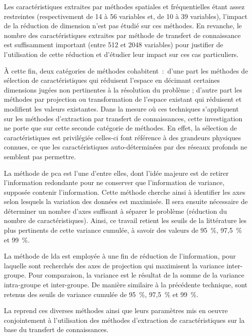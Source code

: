 Les caractéristiques extraites par méthodes spatiales et fréquentielles étant assez restreintes (respectivement de 14 à 56 variables et, de 10 à 39 variables), l'impact de la réduction de dimension n'est pas étudié sur ces méthodes. En revanche, le nombre des caractéristiques extraites par méthode de transfert de connaissance est suffisamment important (entre 512 et 2048 variables) pour justifier de l'utilisation de cette réduction et d'étudier leur impact sur ces cas particuliers.\par

À cette fin, deux catégories de méthodes cohabitent~:~d'une part les méthodes de sélection de caractéristiques qui réduisent l'espace en décimant certaines dimensions jugées non pertinentes à la résolution du problème ; d'autre part les méthodes par projection ou transformation de l'espace existant qui réduisent et modifient les valeurs existantes. Dans la mesure où ces techniques s'appliquent sur les méthodes d'extraction par transfert de connaissances, cette investigation ne porte que sur cette seconde catégorie de méthodes. En effet, la sélection de caractéristiques est privilégiée celles-ci font référence à des grandeurs physiques connues, ce que les caractéristiques auto-déterminées par des réseaux profonds ne semblent pas permettre.\par

La méthode de \gls{pca} est l'une d'entre elles, dont l'idée majeure est de retirer l'information redondante pour ne conserver que l'information de variance, supposée contenir l'information. Cette méthode cherche ainsi à identifier les axes selon lesquels la variation des données est maximisée. Il sera ensuite nécessaire de déterminer un nombre d'axes suffisant à séparer le problème (réduction du nombre de caractéristiques). Ainsi, ce travail retient les seuils de la littérature les plus pertinents de cette variance cumulée, à savoir des valeurs de 95~\%, 97,5~\% et 99~\%.\par

La méthode de \gls{lda} est employée à une fin de réduction de l'information, pour laquelle sont recherchés des axes de projection qui maximisent la variance inter-groupe. Pour comparaison, la variance est le résultat de la somme de la variance intra-groupe et inter-groupe. De manière similaire à la précédente technique, sont retenus des seuils de variance cumulée de 95~\%, 97,5~\% et 99~\%.\par

La  reprend ces diverses méthodes ainsi que leurs paramètres mis en oeuvre conjointement à l'utilisation des méthodes d'extraction de caractéristiques sur la base du transfert de connaissances.\par 


